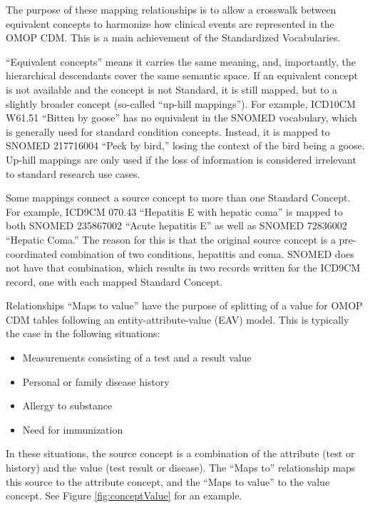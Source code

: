 \documentclass[11pt]{book}
\providecommand{\tightlist}{%
  \setlength{\itemsep}{0pt}\setlength{\parskip}{0pt}}
\theoremstyle{definition}
\theoremstyle{definition}
\theoremstyle{definition}
\theoremstyle{remark}
\begin{document}
The purpose of these mapping relationships is to allow a crosswalk
between equivalent concepts to harmonize how clinical events are
represented in the OMOP CDM. This is a main achievement of the
Standardized Vocabularies.

``Equivalent concepts'' means it carries the same meaning, and,
importantly, the hierarchical descendants cover the same semantic space.
If an equivalent concept is not available and the concept is not
Standard, it is still mapped, but to a slightly broader concept
(so-called ``up-hill mappings''). For example, ICD10CM W61.51 ``Bitten
by goose'' has no equivalent in the SNOMED vocabulary, which is
generally used for standard condition concepts. Instead, it is mapped to
SNOMED 217716004 ``Peck by bird,'' losing the context of the bird being
a goose. Up-hill mappings are only used if the loss of information is
considered irrelevant to standard research use cases.

Some mappings connect a source concept to more than one Standard
Concept. For example, ICD9CM 070.43 ``Hepatitis E with hepatic coma'' is
mapped to both SNOMED 235867002 ``Acute hepatitis E'' as well as SNOMED
72836002 ``Hepatic Coma.'' The reason for this is that the original
source concept is a pre-coordinated combination of two conditions,
hepatitis and coma. SNOMED does not have that combination, which results
in two records written for the ICD9CM record, one with each mapped
Standard Concept.

Relationships ``Maps to value'' have the purpose of splitting of a value
for OMOP CDM tables following an entity-attribute-value (EAV) model.
This is typically the case in the following situations:

\begin{itemize}
\tightlist
\item
  Measurements consisting of a test and a result value
\item
  Personal or family disease history
\item
  Allergy to substance
\item
  Need for immunization
\end{itemize}

In these situations, the source concept is a combination of the
attribute (test or history) and the value (test result or disease). The
``Maps to'' relationship maps this source to the attribute concept, and
the ``Maps to value'' to the value concept. See Figure
\ref{fig:conceptValue} for an example.
\end{document}
